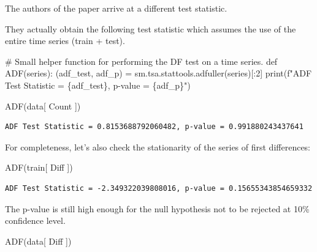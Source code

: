 \documentclass[
  letterpaper,
  DIV=11,
  numbers=noendperiod]{scrartcl}
\newenvironment{Shaded}{\begin{snugshade}}{\end{snugshade}}
\newcommand{\BuiltInTok}[1]{\textcolor[rgb]{0.00,0.23,0.31}{#1}}
\newcommand{\CommentTok}[1]{\textcolor[rgb]{0.37,0.37,0.37}{#1}}
\newcommand{\DecValTok}[1]{\textcolor[rgb]{0.68,0.00,0.00}{#1}}
\newcommand{\KeywordTok}[1]{\textcolor[rgb]{0.00,0.23,0.31}{#1}}
\newcommand{\NormalTok}[1]{\textcolor[rgb]{0.00,0.23,0.31}{#1}}
\newcommand{\OperatorTok}[1]{\textcolor[rgb]{0.37,0.37,0.37}{#1}}
\newcommand{\SpecialCharTok}[1]{\textcolor[rgb]{0.37,0.37,0.37}{#1}}
\newcommand{\SpecialStringTok}[1]{\textcolor[rgb]{0.13,0.47,0.30}{#1}}
\newcommand{\StringTok}[1]{\textcolor[rgb]{0.13,0.47,0.30}{#1}}
\begin{document}
The authors of the paper arrive at a different test statistic.

They actually obtain the following test statistic which assumes the use
of the entire time series (train + test).

\begin{Shaded}
\begin{Highlighting}[]
\CommentTok{\# Small helper function for performing the DF test on a time series. }
\KeywordTok{def}\NormalTok{ ADF(series):}
\NormalTok{    (adf\_test, adf\_p) }\OperatorTok{=}\NormalTok{ sm.tsa.stattools.adfuller(series)[:}\DecValTok{2}\NormalTok{]}
    \BuiltInTok{print}\NormalTok{(}\SpecialStringTok{f"ADF Test Statistic = }\SpecialCharTok{\{}\NormalTok{adf\_test}\SpecialCharTok{\}}\SpecialStringTok{, p{-}value = }\SpecialCharTok{\{}\NormalTok{adf\_p}\SpecialCharTok{\}}\SpecialStringTok{"}\NormalTok{)}

\NormalTok{ADF(data[ }\StringTok{\textquotesingle{}Count\textquotesingle{}}\NormalTok{ ])}
\end{Highlighting}
\end{Shaded}

\begin{verbatim}
ADF Test Statistic = 0.8153688792060482, p-value = 0.991880243437641
\end{verbatim}

For completeness, let's also check the stationarity of the series of
first differences:

\begin{Shaded}
\begin{Highlighting}[]
\NormalTok{ADF(train[ }\StringTok{\textquotesingle{}Diff\textquotesingle{}}\NormalTok{ ])}
\end{Highlighting}
\end{Shaded}

\begin{verbatim}
ADF Test Statistic = -2.349322039808016, p-value = 0.15655343854659332
\end{verbatim}

The p-value is still high enough for the null hypothesis not to be
rejected at 10\% confidence level.

\begin{Shaded}
\begin{Highlighting}[]
\NormalTok{ADF(data[ }\StringTok{\textquotesingle{}Diff\textquotesingle{}}\NormalTok{ ])}
\end{Highlighting}
\end{Shaded}
\end{document}
